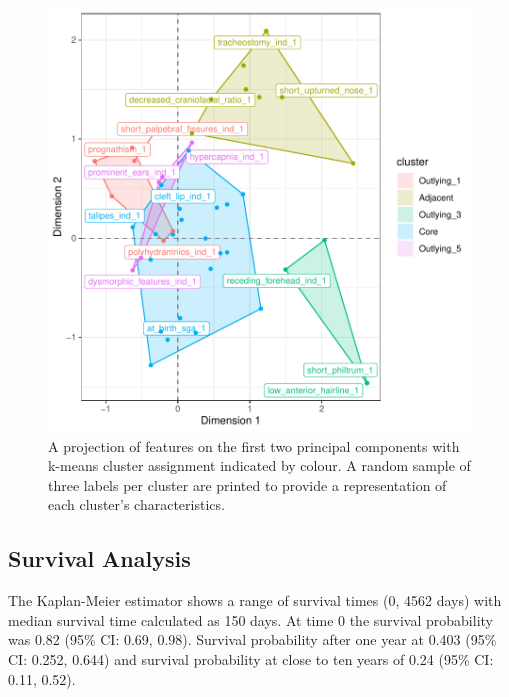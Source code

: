\documentclass[
  authoryear,
  preprint,
  3p]{elsarticle}
\begin{document}
\begin{figure}

{\centering \includegraphics{paper_files/figure-pdf/fig-clust-1.pdf}

}

\caption{\label{fig-clust}A projection of features on the first two
principal components with k-means cluster assignment indicated by
colour. A random sample of three labels per cluster are printed to
provide a representation of each cluster's characteristics.}

\end{figure}

\hypertarget{survival-analysis-1}{%
\subsection{Survival Analysis}\label{survival-analysis-1}}

The Kaplan-Meier estimator shows a range of survival times (0, 4562
days) with median survival time calculated as 150 days. At time 0 the
survival probability was 0.82 (95\% CI: 0.69, 0.98). Survival
probability after one year at 0.403 (95\% CI: 0.252, 0.644) and survival
probability at close to ten years of 0.24 (95\% CI: 0.11, 0.52).
\end{document}
